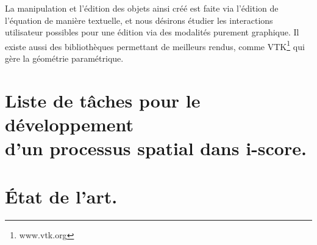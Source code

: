\documentclass[french,12pt]{article}
\begin{document}
La manipulation et l'édition des objets ainsi créé est faite via l'édition de l'équation de manière textuelle, et nous désirons étudier les interactions utilisateur possibles pour une édition via des modalités purement graphique. Il existe aussi des bibliothèques permettant de meilleurs rendus, comme VTK\footnote{www.vtk.org} qui gère la géométrie paramétrique.

\newpage

\renewcommand{\appendixtocname}{Annexes}
\renewcommand{\appendixpagename}{Annexes}
\begin{appendices}
    \vspace{8cm}
\section{Liste de tâches pour le développement~\\d'un processus spatial dans i-score.}\label{annex.1}


\newpage\vspace*{8cm}\section{État de l'art.}\label{annex.2}


\end{appendices}
\end{document}
